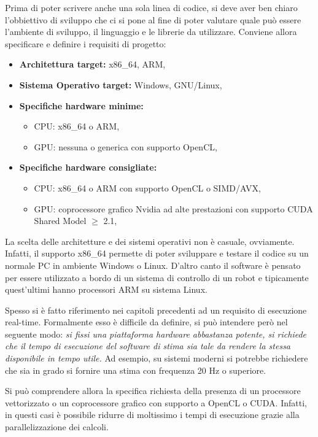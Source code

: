 Prima di poter scrivere anche una sola linea di codice, si deve aver ben chiaro l'obbiettivo di sviluppo che ci si pone al fine di poter valutare quale può essere l'ambiente di sviluppo, il linguaggio e le librerie da utilizzare.  Conviene allora specificare e definire i requisiti di progetto:
\begin{itemize}
	\item \textbf{Architettura target:}  x86\_64, ARM,
	\item \textbf{Sistema Operativo target:}  Windows, GNU/Linux,
	\item \textbf{Specifiche hardware minime:}
	\begin{itemize}
		\item CPU: x86\_64 o ARM,
		\item GPU: nessuna o generica con supporto OpenCL,
	\end{itemize} 
	\item \textbf{Specifiche hardware consigliate:}
		\begin{itemize}
			\item CPU: x86\_64 o ARM con supporto OpenCL o SIMD/AVX,
			\item GPU: coprocessore grafico Nvidia ad alte prestazioni con supporto CUDA Shared Model $\ge$ 2.1,
		\end{itemize}			 
\end{itemize}

La scelta delle architetture e dei sistemi operativi non è casuale, ovviamente. Infatti, il supporto x86\_64 permette di poter sviluppare e testare il codice su un normale PC in ambiente Windows o Linux. D'altro canto il software è pensato per essere utilizzato a bordo di un sistema di controllo di un robot e tipicamente quest'ultimi hanno processori ARM su sistema Linux.

Spesso si è fatto riferimento nei capitoli precedenti ad un requisito di esecuzione real-time. Formalmente esso è difficile da definire, si può intendere però nel seguente modo: \textit{si fissi una piattaforma hardware abbastanza potente, si richiede che il tempo di esecuzione del software di stima sia tale da rendere la stessa disponibile in tempo utile.} Ad esempio, su sistemi moderni si potrebbe richiedere che sia in grado si fornire una stima con frequenza 20 Hz o superiore.
 
Si può comprendere allora la specifica richiesta della presenza di un processore vettorizzato o un coprocessore grafico con supporto a OpenCL o CUDA. Infatti, in questi casi è possibile ridurre di moltissimo i tempi di esecuzione grazie alla parallelizzazione dei calcoli.

